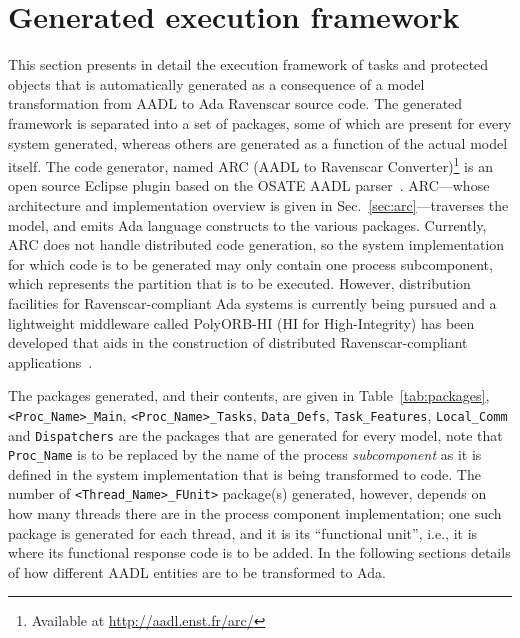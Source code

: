 \section{Generated execution framework}
This section presents in detail the execution framework of tasks and
protected objects that is automatically generated as a consequence of
a model transformation from AADL to Ada Ravenscar source code. The
generated framework is separated into a set of packages, some of which
are present for every system generated, whereas others are generated
as a function of the actual model itself. The code generator, named
ARC (AADL to Ravenscar Converter)\footnote{Available at
  \url{http://aadl.enst.fr/arc/}} is an open source Eclipse plugin
based on the OSATE AADL parser~\cite{sei-osate}. ARC---whose
architecture and implementation overview is given in
Sec.~\ref{sec:arc}---traverses the model, and emits Ada language
constructs to the various packages. Currently, ARC does not handle
distributed code generation, so the system implementation for which
code is to be generated may only contain one process subcomponent,
which represents the partition that is to be executed. However,
distribution facilities for Ravenscar-compliant Ada systems is
currently being pursued and a lightweight middleware called PolyORB-HI
(HI for High-Integrity) has been developed that aids in the
construction of distributed Ravenscar-compliant
applications~\cite{zalila@ae07}.

The packages generated, and their contents, are given in
Table~\ref{tab:packages}, \texttt{<Proc\_Name>\_Main},
\texttt{<Proc\_Name>\-\_Tasks}, \texttt{Data\_Defs},
\texttt{Task\_Features}, \texttt{Local\_Comm} and \texttt{Dispatchers}
are the packages that are generated for every model, note that
\texttt{Proc\_Name} is to be replaced by the name of the process
\emph{subcomponent} as it is defined in the system implementation that
is being transformed to code. The number of
\texttt{<Thread\_Name>\_FUnit>} package(s) generated, however, depends
on how many threads there are in the process component implementation;
one such package is generated for each thread, and it is its
``functional unit'', i.e., it is where its functional response code is
to be added. In the following sections details of how different AADL
entities are to be transformed to Ada.

